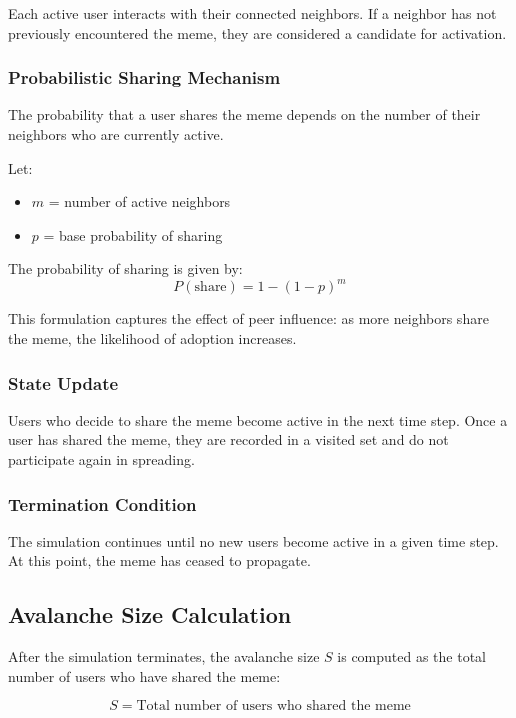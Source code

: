 \documentclass[12pt]{article}
\begin{document}
Each active user interacts with their connected neighbors. If a neighbor has not previously encountered the meme, they are considered a candidate for activation.

\subsubsection{Probabilistic Sharing Mechanism}

The probability that a user shares the meme depends on the number of their neighbors who are currently active.

Let:
\begin{itemize}
    \item $m$ = number of active neighbors
    \item $p$ = base probability of sharing
\end{itemize}

The probability of sharing is given by:
\begin{equation}
P(\text{share}) = 1 - (1 - p)^m
\end{equation}

This formulation captures the effect of peer influence: as more neighbors share the meme, the likelihood of adoption increases.

\subsubsection{State Update}

Users who decide to share the meme become active in the next time step. Once a user has shared the meme, they are recorded in a visited set and do not participate again in spreading.

\subsubsection{Termination Condition}

The simulation continues until no new users become active in a given time step. At this point, the meme has ceased to propagate.

\subsection{Avalanche Size Calculation}

After the simulation terminates, the avalanche size $S$ is computed as the total number of users who have shared the meme:

\begin{equation}
S = \text{Total number of users who shared the meme}
\end{equation}
\end{document}

